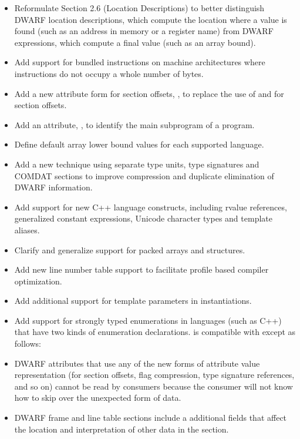 \begin{itemize}

\item Reformulate 
Section 2.6 (Location Descriptions) 
to better distinguish DWARF location descriptions, which
compute the location where a value is found (such as an address in memory or a register
name) from DWARF expressions, which compute a final value (such as an array bound).
\item Add support for bundled instructions on machine architectures where instructions do not
occupy a whole number of bytes.
\item Add a new attribute form for section offsets, , to replace the use
of  and  for section offsets.
\item Add an attribute, , to identify the main subprogram of a
program.
\item Define default array lower bound values for each supported language.
\item Add a new technique using separate type units, type signatures and COMDAT sections to
improve compression and duplicate elimination of DWARF information.
\item Add support for new C++ language constructs, including rvalue references, generalized
constant expressions, Unicode character types and template aliases.
\item Clarify and generalize support for packed arrays and structures.
\item Add new line number table support to facilitate profile based compiler optimization.
\item Add additional support for template parameters in instantiations.
\item Add support for strongly typed enumerations in languages (such as C++) that have two
kinds of enumeration declarations.
 is compatible with 
 except as follows:
\item DWARF attributes that use any of the new forms of attribute value representation (for
section offsets, flag compression, type signature references, and so on) cannot be read by
consumers because the consumer will not know how to skip over the
unexpected form of data.
\item DWARF frame and line table sections include a additional fields that affect the location
and interpretation of other data in the section.
\end{itemize}


